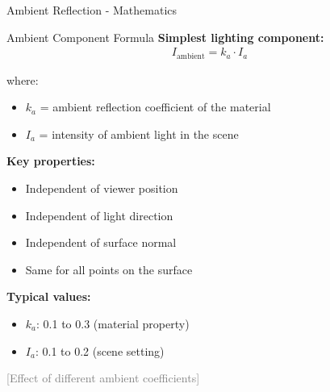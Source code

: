 \begin{frame}{Ambient Reflection - Mathematics}
  \begin{mathbox}{Ambient Component Formula}
    \textbf{Simplest lighting component:}
    \begin{align}
      I_{\text{ambient}} = k_a \cdot I_a
    \end{align}

    where:
    \begin{itemize}
      \item $k_a$ = ambient reflection coefficient of the material
      \item $I_a$ = intensity of ambient light in the scene
    \end{itemize}

    \vspace{0.3cm}
    \pause
    \textbf{Key properties:}
    \begin{itemize}
      \item Independent of viewer position
      \item Independent of light direction
      \item Independent of surface normal
      \item Same for all points on the surface
    \end{itemize}

    \vspace{0.3cm}
    \pause
    \textbf{Typical values:}
    \begin{itemize}
      \item $k_a$: 0.1 to 0.3 (material property)
      \item $I_a$: 0.1 to 0.2 (scene setting)
    \end{itemize}
  \end{mathbox}

  \vspace{0.3cm}
  \pause
  \textcolor{gray}{[Effect of different ambient coefficients]}
\end{frame}

